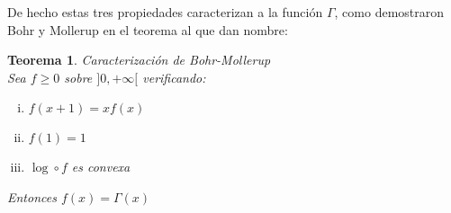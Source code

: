 \documentclass[a4paper, 11pt]{amsart}
\newtheorem{theorem}{Teorema}[section]
\theoremstyle{definition}
\theoremstyle{remark}
\numberwithin{equation}{section}
\begin{document}
  De hecho estas tres propiedades caracterizan a la función $\Gamma$, como demostraron Bohr y
  Mollerup en el teorema al que dan nombre:
      
  \begin{theorem}{Caracterización de Bohr-Mollerup}\\
  
  Sea $f\ge 0$ sobre $]0,+\infty[$ verificando:
  
  \begin{enumerate}[i.]
   \item $f(x+1) = xf(x)$
   \item $f(1) = 1$
   \item $\log \circ f$ es convexa
  \end{enumerate}
  
   Entonces $f(x) = \Gamma(x)$
  \label{caracterizacion}
  \end{theorem}
\end{document}
